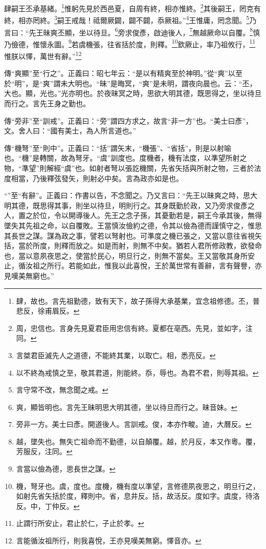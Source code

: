 肆嗣王丕承基緒。\footnote{肆，故也。言先祖勤德，致有天下，故子孫得大承基業，宜念祖修德。丕，普悲反，徐甫眉反。}惟躬先見於西邑夏，自周有終，相亦惟終。\footnote{周，忠信也。言身先見夏君臣用忠信有終。夏都在亳西。先見，並如字，注同。}其後嗣王，罔克有終，相亦罔終。\footnote{言桀君臣滅先人之道德，不能終其業，以取亡。相，悉亮反。}嗣王戒哉！祗爾厥闢，闢不闢，忝厥祖。”\footnote{以不終為戒慎之至，敬其君道，則能終。忝，辱也。為君不君，則辱其祖。}王惟庸，罔念聞。\footnote{言守常不改，無念聞之戒。}乃言曰：“先王昧爽丕顯，坐以待旦。\footnote{爽，顯皆明也。言先王昧明思大明其德，坐以待旦而行之。昧音妹。}旁求俊彥，啟迪後人，\footnote{旁非一方。美士曰彥。開道後人。言訓戒。俊，本亦作畯。迪，大曆反。}無越厥命以自覆。\footnote{越，墜失也。無失亡祖命而不勤德，以自顛覆。越，於月反，本又作粵。覆，芳服反，注同。}慎乃儉德，惟懷永圖。\footnote{言當以儉為德，思長世之謀。}若虞機張，往省括於度，則釋。\footnote{機，弩牙也。虞，度也。度機，機有度以準望，言修德夙夜思之，明旦行之，如射先省矢括於度，釋則中。省，息井反。括，故活反。度如字。虞度，待洛反。中，丁仲反。}欽厥止，率乃祖攸行，\footnote{止謂行所安止，君止於仁，子止於孝。}惟朕以懌，萬世有辭。”\footnote{言能循汝祖所行，則我喜悅，王亦見嘆美無窮。懌音亦。}

{\noindent\zhuan{}\fzbyks 傳“爽顯”至“行之”。正義曰：昭七年云：“是以有精爽至於神明。”從“爽”以至於“明”，是“爽”謂未大明也。“昧”是晦冥，“爽”是未明，謂夜向晨也。云：“丕，大也。顯，光也。”光亦明也。於夜昧冥之時，思欲大明其德，既思得之，坐以待旦而行之。言先王身之勤也。 \par}

{\noindent\zhuan{}\fzbyks 傳“旁非”至“訓戒”。正義曰：“旁”謂四方求之，故言“非一方”也。“美士曰彥”，文。舍人曰：“國有美士，為人所言道也。” \par}

{\noindent\zhuan{}\fzbyks 傳“機弩”至“則中”。正義曰：“括”謂矢末，“機張”、“省括”，則是以射喻也。“機”是轉關，故為弩牙。“虞”訓度也。度機者，機有法度，以準望所射之物，“準望”則解經“虞”也。如射者弩以張訖機關，先省矢括與所射之物，三者於法度相當，乃後釋弦發矢，則射必中矣。言為政亦如是也。 \par}

{\noindent\shu{}\fzkt “”至“有辭”。正義曰：作書以告，不念聞之。乃又言曰：“先王以昧爽之時，思大明其德，既思得其事，則坐以待旦，明則行之。其身既勤於政，又乃旁求俊彥之人，置之於位，令以開導後人。先王之念子孫，其憂勤若是，嗣王今承其後，無得墜失其先祖之命，以自覆敗。王當慎汝儉約之德，令其以儉為德而謹慎守之，惟思其長世之謀。謀為政之事，譬若以弩射也。可準度之機已張之，又當以意往省視矢括，當於所度，則釋而放之。如是而射，則無不中矣。猶若人君所修政教，欲發命也，當以意夙夜思之，使當於民心，明旦行之，則無不當矣。王又當敬其身所安止，循汝祖之所行。若能如此，惟我以此喜悅，王於萬世常有善辭，言有聲譽，亦見嘆美無窮也。” \par}


